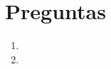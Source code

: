 \documentclass[11pt]{article}
\begin{document}



\pagebreak

\section*{Preguntas}

\begin{enumerate}
    \item 
    \item 
\end{enumerate}
\end{document}

